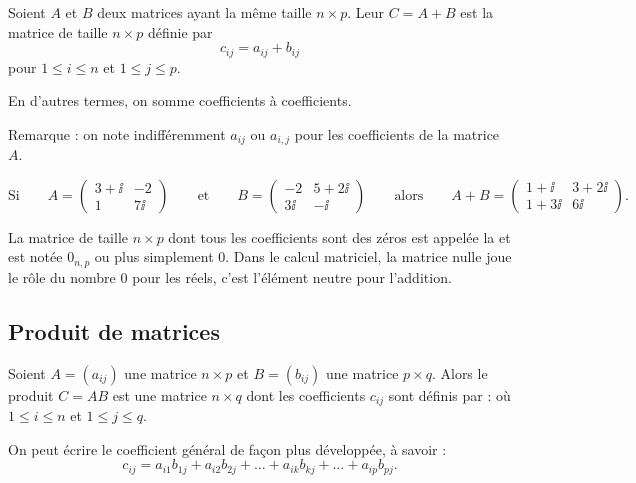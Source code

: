 \documentclass[11pt,class=report,crop=false]{standalone}
\begin{document}
\begin{definition}
Soient $A$ et $B$ deux matrices ayant la même taille $n\times p$.
Leur  $C=A+B$ est la matrice de taille $n\times p$ définie par
\[c_{ij}=a_{ij}+b_{ij}\]
pour $1\le i \le n$ et $1 \le j \le p$.
\end{definition}

En d'autres termes, on somme coefficients à coefficients.

Remarque : on note indifféremment $a_{ij}$ ou $a_{i,j}$
pour les coefficients de la matrice $A$.



$$\text{Si} \qquad
A  =  \begin{pmatrix}
3+\ii & -2\\
1 & 7\ii
\end{pmatrix}
\qquad \text{et} \qquad
B = \begin{pmatrix}
-2 & 5+2\ii \\
3\ii & -\ii
    \end{pmatrix}
\qquad \text{alors} \qquad A + B = \begin{pmatrix}
1+\ii &3+2\ii\\
1+3\ii & 6\ii
\end{pmatrix}.
$$

La matrice de taille $n\times p$ dont tous les coefficients sont des zéros
est appelée la  et est notée $0_{n,p}$ ou plus simplement $0$.
Dans le calcul matriciel, la matrice nulle joue le rôle du nombre $0$ pour les réels, c'est l'élément neutre pour l'addition.

\subsection{Produit de matrices}


\begin{definition}
Soient $A=(a_{ij})$ une matrice $n\times p$ et $B=(b_{ij})$ une matrice $p\times q$.
Alors le produit $C=AB$ est une matrice $n\times q$ dont les coefficients $c_{ij}$
sont définis par :
où $1\le i \le n$ et $1\le j \le q$.
\end{definition}

On peut écrire le coefficient général de façon plus développée, à savoir :
$$c_{ij}=a_{i1}b_{1j}+a_{i2}b_{2j}+ \dots +
a_{ik}b_{kj}+ \dots + a_{ip}b_{pj}.$$
\end{document}
